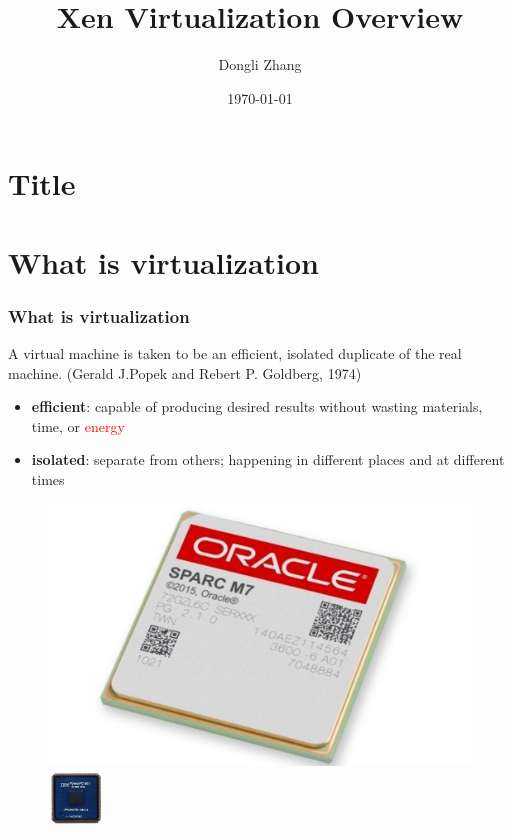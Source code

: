 \documentclass[aspectratio=169]{beamer}
\title[Xen Overview]{Xen Virtualization Overview} %
\author{Dongli Zhang} %
\institute[Oracle] %
{
Oracle Asia Research and Development Centers (Beijing) \\ %
\medskip
\textit{dongli.zhang@oracle.com} %
}
\date{\today} %
\begin{document}

\section{Title}
\begin{frame}
\titlepage %
\end{frame}


\section{What is virtualization}
\begin{frame}
\frametitle{What is virtualization}
A virtual machine is taken to be an efficient, isolated duplicate of the real machine. (Gerald J.Popek and Rebert P. Goldberg, 1974) \pause
\begin{itemize}
\item \textbf{efficient}: capable of producing desired results without wasting materials, time, or \textcolor<3->{red}{energy}\pause \pause
\item \textbf{isolated}: separate from others; happening in different places and at different times \pause
\end{itemize}
\begin{center}
\begin{figure}
\includegraphics[width=0.3\linewidth]{figures/sparc.pdf}
\includegraphics[width=0.2\linewidth]{figures/power.pdf}
\end{figure}
\end{center}
\end{frame}

\end{document}

